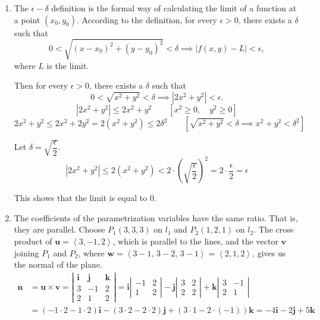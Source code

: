 \documentclass[a4paper, 12pt]{article}
\begin{document}
\begin{enumerate}[leftmargin=*,label=\textbf{\arabic*.}]
\newpage
\item The $\epsilon-\delta$ definition is the formal way of calculating the limit of a function at a point $(x_0,y_0)$. According to the definition, for every $\epsilon>0$, there exists a $\delta$ such that
\[0<\sqrt{(x-x_0)^2+(y-y_0)^2}<\delta\implies\left|f(x,y)-L\right|<\epsilon,\]
where $L$ is the limit.

Then for every $\epsilon>0$, there exists a $\delta$ such that
\[0<\sqrt{x^2+y^2}<\delta\implies\left|2x^2+y^2\right|<\epsilon.\]
\[\left|2x^2+y^2\right|\leq2x^2+y^2\qquad\left[x^2\geq0,\quad y^2\geq0\right]\]
\[2x^2+y^2\leq2x^2+2y^2=2\left(x^2+y^2\right)\leq2\delta^2\qquad\left[\sqrt{x^2+y^2}<\delta\implies  x^2+y^2<\delta^2\right]\]

Let $\delta=\sqrt{\dfrac{\epsilon}2}$.
\[\left|2x^2+y^2\right|\leq2\left(x^2+y^2\right)<2\cdot\left(\sqrt{\frac{\epsilon}2}\right)^2=2\cdot\frac{\epsilon}2=\epsilon\]

This shows that the limit is equal to $0$.

\item The coefficients of the parametrization variables have the same ratio. That is, they are parallel. Choose $P_1(3,3,3)$ on $l_1$ and $P_2(1,2,1)$ on $l_2$. The cross product of $\mathbf u=\left\langle3,-1,2\right\rangle$, which is parallel to the lines, and the vector $\mathbf v$ joining $P_1$ and $P_2$, where $\mathbf w=\left\langle3-1,\,3-2,\,3-1\right\rangle=\left\langle2,1,2\right\rangle$, gives us the normal of the plane.
\begin{align*}\mathbf n&=\mathbf{u}\times\mathbf{v}=\left|\begin{array}{ccc}
\mathbf{i}&\mathbf{j}&\mathbf{k}\\
3&-1&2\\
2&1&2
\end{array}\right|=\mathbf{i}\left|\begin{array}{cc}
-1&2\\1&2
\end{array}\right|-\mathbf{j}\left|\begin{array}{cc}
3&2\\2&2
\end{array}\right|+\mathbf{k}\left|\begin{array}{cc}
3&-1\\2&1
\end{array}\right|\\[1em]&=(-1\cdot2-1\cdot2)\mathbf{i}-(3\cdot2-2\cdot2)\mathbf{j}+(3\cdot1-2\cdot(-1))\mathbf{k}=-4\mathbf i-2\mathbf j+5\mathbf k\end{align*}


\end{enumerate}
\end{document}
